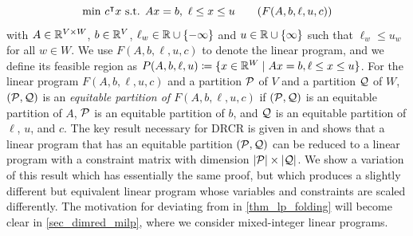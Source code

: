 \documentclass[pdflatex,sn-mathphys-num]{sn-jnl}%
\theoremstyle{thmstyleone}%
\theoremstyle{thmstylethree}%
\theoremstyle{thmstyletwo}%
\begin{document}
\begin{equation}
    \label{lp_orig_signed}
    \min \,c^{\intercal} x \text{  s.t. } A x = b,~\ell \leq x \leq u  \tag{$F(A,b,\ell,u,c)$}
\end{equation}
with $A\in \mathbb{R}^{V\times W}$, $b\in \mathbb{R}^V$, $\ell_w \in \mathbb{R} \cup \{-\infty\}$ and $u\in \mathbb{R}\cup \{\infty\}$ such that $\ell_w \leq u_w$ for all $w\in W$.
We use $F(A,b,\ell,u,c)$ to denote the linear program, and we define its feasible region as $P(A,b,\ell, u) \coloneqq \{ x\in \R^W \mid A x = b, \ell \leq x \leq u\}$.
For the linear program $F(A,b,\ell, u, c)$ and a partition $\mathcal{P}$ of $V$ and a partition $\mathcal{Q}$ of $W$, $(\mathcal{P},\mathcal{Q})$ is an \emph{equitable partition of $F(A,b,\ell,u,c)$} if $(\mathcal{P},\mathcal{Q})$ is an equitable partition of $A$, $\mathcal{P}$ is an equitable partition of $b$, and $\mathcal{Q}$ is an equitable partition of $\ell$, $u$, and $c$. The key result necessary for DRCR is given in \cite[Lemma 7.1]{Grohe2014} and shows that a linear program that has an equitable partition $(\mathcal{P},\mathcal{Q})$ can be reduced to a linear program with a constraint matrix with dimension $|\mathcal{P}|\times |\mathcal{Q}|$. We show a variation of this result which has essentially the same proof, but which produces a slightly different but equivalent linear program whose variables and constraints are scaled differently. The motivation for deviating from \cite{Grohe2014} in \cref{thm_lp_folding} will become clear in \cref{sec_dimred_milp}, where we consider mixed-integer linear programs.
\end{document}
